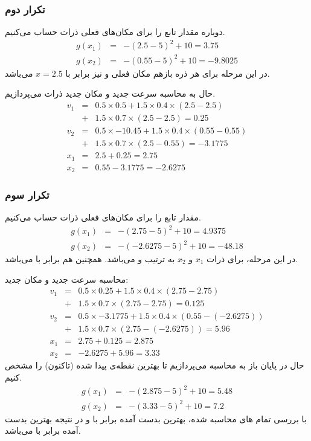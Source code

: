 \documentclass[12pt]{article}
\begin{document}
	 \subsubsection{تکرار دوم}
	 دوباره مقدار تابع  را برای مکان‌های فعلی ذرات حساب می‌کنیم.
	 \begin{eqnarray*}
	 	g(x_{1}) &=& -(2.5-5)^{2} + 10 = 3.75\\
	 	g(x_{2}) &=& -(0.55 - 5)^{2} + 10 = -9.8025
	 \end{eqnarray*}
	 در این مرحله  برای هر ذره بازهم مکان فعلی و  نیز برابر با $x=2.5$ می‌باشد.
	 
	 حال به محاسبه سرعت جدید و مکان جدید ذرات می‌پردازیم.
	 \begin{eqnarray*}
	 	v_{1} &=& 0.5\times 0.5 + 1.5\times 0.4\times(2.5 - 2.5)\\
	 	&+& 1.5\times 0.7\times(2.5 - 2.5) = 0.25\\
	 	v_{2} &=& 0.5\times -10.45 + 1.5\times 0.4\times (0.55 - 0.55)\\
	 	&+& 1.5\times 0.7 \times(2.5 - 0.55) = -3.1775\\
	 	x_{1} &=& 2.5 + 0.25 = 2.75\\
	 	x_{2} &=& 0.55 - 3.1775 = -2.6275
	 \end{eqnarray*}
	 \subsubsection{تکرار سوم}
	 مقدار تابع  را برای مکان‌های فعلی ذرات حساب می‌کنیم.
	 \begin{eqnarray*}
	 	g(x_{1}) &=& -(2.75-5)^{2} + 10 = 4.9375\\
	 	g(x_{2}) &=& -(-2.6275-5)^{2} + 10 = -48.18
	 \end{eqnarray*}
	 در این مرحله،  برای ذرات $x_{1}$ و $x_{2}$ به ترتیب  و  می‌باشد. همچنین  هم برابر با  می‌باشد.
	 
	 محاسبه سرعت جدید و مکان جدید:
	 \begin{eqnarray*}
	 	v_{1} &=& 0.5\times 0.25 + 1.5\times 0.4\times (2.75 - 2.75)\\
	 	&+& 1.5\times 0.7\times (2.75 - 2.75) = 0.125\\
	 	v_{2} &=& 0.5\times -3.1775 + 1.5\times 0.4\times (0.55 - (-2.6275))\\
	 	&+& 1.5\times 0.7\times (2.75 - (-2.6275)) = 5.96\\
	 	x_{1} &=& 2.75 + 0.125 = 2.875\\
	 	x_{2} &=& -2.6275 +5.96 = 3.33
	 \end{eqnarray*}
	 حال در پایان باز به محاسبه  می‌پردازیم تا بهترین نقطه‌ی پیدا شده (تاکنون) را مشخص کنیم.
	 \begin{eqnarray*}
	 	g(x_{1}) &=& -(2.875 - 5)^{2} + 10 = 5.48\\
	 	g(x_{2}) &=& -(3.33 - 5)^{2} + 10 = 7.2
	 \end{eqnarray*}
	 با بررسی تمام های محاسبه شده، بهترین  بدست آمده برابر با  و در نتیجه بهترین  بدست آمده برابر با  می‌باشد.
\end{document}
